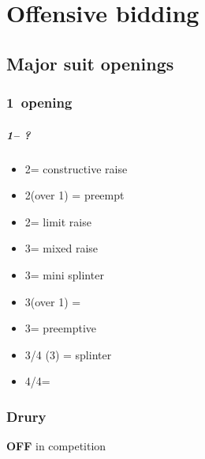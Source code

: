 \documentclass[12pt, a4paper]{report}
\begin{document}
\part*{\colorbox{RoyalPurple!30}{Offensive bidding}}
 {


    \chapter*{\colorbox{Plum!30}{Major suit openings}}
     {

        \section*{\colorbox{blue!30}{1\major\ opening}}
         {
            \subsubsection*{1\major -- ?}
            \begin{itemize}
                \item 2\major = constructive raise
                \item 2\spades (over 1\hearts) = preempt
                \item 2\nt = limit raise
                \item 3\clubs = mixed raise
                \item 3\diams = mini splinter
                \item 3\hearts (over 1\spades) = \nat\ \inv
                \item 3\major = preemptive
                \item 3\nt/4 (3\spades) = splinter
                \item 4\diams/4\hearts = \major
            \end{itemize}
        }

        \section*{\colorbox{blue!30}{Drury}}
         {
            {\textbf{OFF}} in competition

}}}
\end{document}
